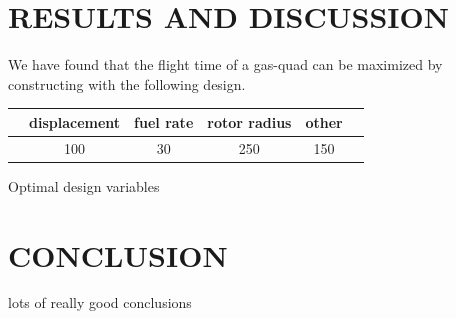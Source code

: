 \documentclass[letterpaper, 10 pt, conference]{ieeeconf}  %
\makeatletter
\newenvironment{tablehere}
  {\def\@captype{table}}
  {}
\makeatother
\begin{document}

\section{RESULTS AND DISCUSSION}

We have found that the flight time of a gas-quad can be maximized by constructing with the following design.

\begin{tablehere}
\centering
\begin{tabulary}{0.5\textwidth}{|C|C|C|C|C|C|}
\hline
       & displacement & fuel rate & rotor radius & other \\ \hline
  & 100 & 30 & 250 & 150 \\ \hline
\end{tabulary}
\caption{Optimal design variables}
\label{table:fw_loop_rates}
\end{tablehere}



\section{CONCLUSION}

lots of really good conclusions









\end{document}
